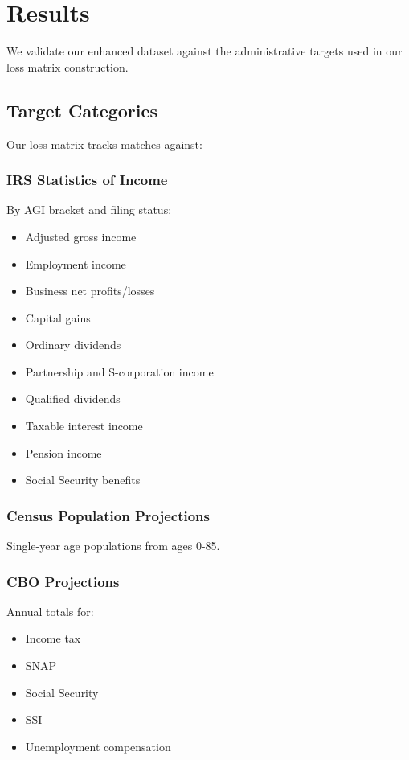 \section{Results}

We validate our enhanced dataset against the administrative targets used in our loss matrix construction.

\subsection{Target Categories}

Our loss matrix tracks matches against:

\subsubsection{IRS Statistics of Income}
By AGI bracket and filing status:
\begin{itemize}
    \item Adjusted gross income
    \item Employment income
    \item Business net profits/losses
    \item Capital gains
    \item Ordinary dividends
    \item Partnership and S-corporation income
    \item Qualified dividends
    \item Taxable interest income
    \item Pension income
    \item Social Security benefits
\end{itemize}

\subsubsection{Census Population Projections}
Single-year age populations from ages 0-85.

\subsubsection{CBO Projections}
Annual totals for:
\begin{itemize}
    \item Income tax
    \item SNAP
    \item Social Security
    \item SSI
    \item Unemployment compensation
\end{itemize}

